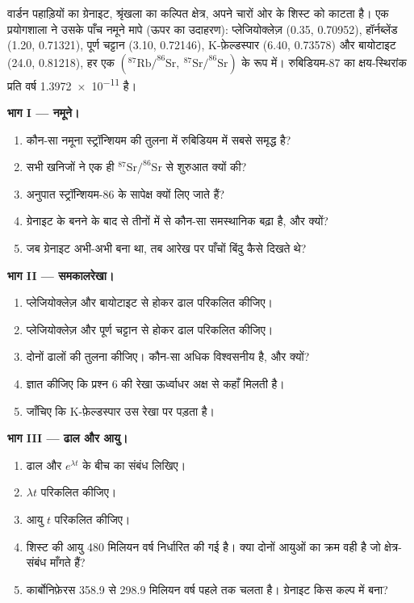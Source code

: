 \begin{problem}[{सप्ताहांत समस्या --- वार्डन ग्रेनाइट का काल-निर्धारण}]
\label{pb:g12:age-of-the-earth:1}
वार्डन पहाड़ियों का ग्रेनाइट, श्रृंखला का कल्पित क्षेत्र, अपने चारों ओर के
शिस्ट को काटता है। एक प्रयोगशाला ने उसके पाँच नमूने मापे (ऊपर का उदाहरण):
प्लेजियोक्लेज़ (0.35, 0.70952), हॉर्नब्लेंड (1.20, 0.71321), पूर्ण चट्टान (3.10,
0.72146), K-फ़ेल्डस्पार (6.40, 0.73578) और बायोटाइट (24.0, 0.81218), हर एक
$(^{87}\mathrm{Rb}/^{86}\mathrm{Sr},\ ^{87}\mathrm{Sr}/^{86}\mathrm{Sr})$ के रूप में।
रुबिडियम-87 का क्षय-स्थिरांक प्रति वर्ष \num{1.3972e-11} है।

\medskip
\noindent\textbf{भाग I --- नमूने।}
\begin{enumerate}
  \item कौन-सा नमूना स्ट्रॉन्शियम की तुलना में रुबिडियम में सबसे समृद्ध है?
  \item सभी खनिजों ने एक ही
        $^{87}\mathrm{Sr}/^{86}\mathrm{Sr}$ से शुरुआत क्यों की?
  \item अनुपात स्ट्रॉन्शियम-86 के सापेक्ष क्यों लिए जाते हैं?
  \item ग्रेनाइट के बनने के बाद से तीनों में से कौन-सा समस्थानिक बढ़ा है, और
        क्यों?
  \item जब ग्रेनाइट अभी-अभी बना था, तब आरेख पर पाँचों बिंदु कैसे
        दिखते थे?
\end{enumerate}

\medskip
\noindent\textbf{भाग II --- समकालरेखा।}
\begin{enumerate}[resume]
  \item प्लेजियोक्लेज़ और बायोटाइट से होकर ढाल परिकलित कीजिए।
  \item प्लेजियोक्लेज़ और पूर्ण चट्टान से होकर ढाल परिकलित कीजिए।
  \item दोनों ढालों की तुलना कीजिए। कौन-सा अधिक विश्वसनीय है, और क्यों?
  \item ज्ञात कीजिए कि प्रश्न 6 की रेखा ऊर्ध्वाधर अक्ष से कहाँ मिलती है।
  \item जाँचिए कि K-फ़ेल्डस्पार उस रेखा पर पड़ता है।
\end{enumerate}

\medskip
\noindent\textbf{भाग III --- ढाल और आयु।}
\begin{enumerate}[resume]
  \item ढाल और $e^{\lambda t}$ के बीच का संबंध लिखिए।
  \item $\lambda t$ परिकलित कीजिए।
  \item आयु $t$ परिकलित कीजिए।
  \item शिस्ट की आयु 480 मिलियन वर्ष निर्धारित की गई है। क्या दोनों
        आयुओं का क्रम वही है जो क्षेत्र-संबंध माँगते हैं?
  \item कार्बोनिफ़ेरस 358.9 से 298.9 मिलियन वर्ष पहले तक चलता है।
        ग्रेनाइट किस कल्प में बना?
\end{enumerate}


\end{problem}
